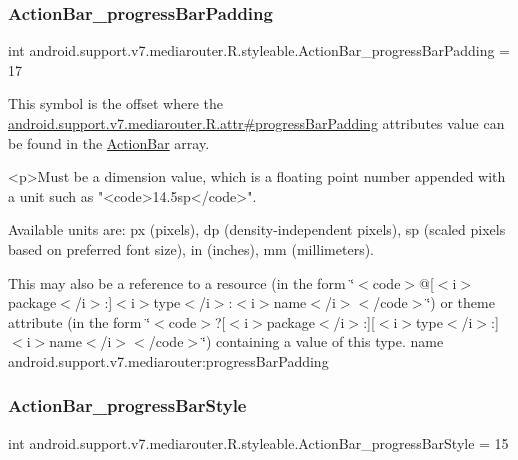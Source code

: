 \subsubsection{\texorpdfstring{Action\+Bar\+\_\+progress\+Bar\+Padding}{ActionBar\_progressBarPadding}}
{\footnotesize\ttfamily int android.\+support.\+v7.\+mediarouter.\+R.\+styleable.\+Action\+Bar\+\_\+progress\+Bar\+Padding = 17\hspace{0.3cm}{\ttfamily [static]}}

This symbol is the offset where the \hyperlink{classandroid_1_1support_1_1v7_1_1mediarouter_1_1R_1_1attr_a4501e46b158aa49c8d42d3183d3fec44}{android.\+support.\+v7.\+mediarouter.\+R.\+attr\#progress\+Bar\+Padding} attribute\textquotesingle{}s value can be found in the \hyperlink{classandroid_1_1support_1_1v7_1_1mediarouter_1_1R_1_1styleable_adc4d3c0d096085367f12d025007aa53f}{Action\+Bar} array.

\begin{DoxyVerb}      <p>Must be a dimension value, which is a floating point number appended with a unit such as "<code>14.5sp</code>".
\end{DoxyVerb}
 Available units are\+: px (pixels), dp (density-\/independent pixels), sp (scaled pixels based on preferred font size), in (inches), mm (millimeters). 

This may also be a reference to a resource (in the form \char`\"{}$<$code$>$@\mbox{[}$<$i$>$package$<$/i$>$\+:\mbox{]}$<$i$>$type$<$/i$>$\+:$<$i$>$name$<$/i$>$$<$/code$>$\char`\"{}) or theme attribute (in the form \char`\"{}$<$code$>$?\mbox{[}$<$i$>$package$<$/i$>$\+:\mbox{]}\mbox{[}$<$i$>$type$<$/i$>$\+:\mbox{]}$<$i$>$name$<$/i$>$$<$/code$>$\char`\"{}) containing a value of this type.  name android.\+support.\+v7.\+mediarouter\+:progress\+Bar\+Padding \mbox{\label{classandroid_1_1support_1_1v7_1_1mediarouter_1_1R_1_1styleable_ac7aa56615dec1a7274eb0896d2046b20}} 
\subsubsection{\texorpdfstring{Action\+Bar\+\_\+progress\+Bar\+Style}{ActionBar\_progressBarStyle}}
{\footnotesize\ttfamily int android.\+support.\+v7.\+mediarouter.\+R.\+styleable.\+Action\+Bar\+\_\+progress\+Bar\+Style = 15\hspace{0.3cm}{\ttfamily [static]}}

